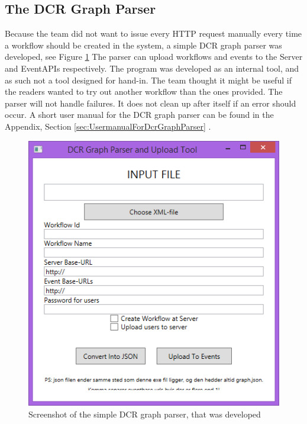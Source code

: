 \subsection{The DCR Graph Parser}
Because the team did not want to issue every HTTP request manually every time a workflow should be created in the system, a simple DCR graph parser was developed, see Figure \ref{fig:DcrGraphParserScreenShot} The parser can upload workflows and events to the Server and EventAPIs respectively. The program was developed as an internal tool, and as such not a tool designed for hand-in. The team thought it might be useful if the readers wanted to try out another workflow than the ones provided. \newline
The parser will not handle failures. It does not clean up after itself if an error should occur.
A short user manual for the DCR graph parser can be found in the Appendix, Section \ref{sec:UsermanualForDcrGraphParser} . 

\begin{figure}
\centering
\includegraphics[width=0.6\linewidth]{Figures/DCRParser}
\caption{\label{fig:DcrGraphParserScreenShot} Screenshot of the simple DCR graph parser, that was developed}
\end{figure}